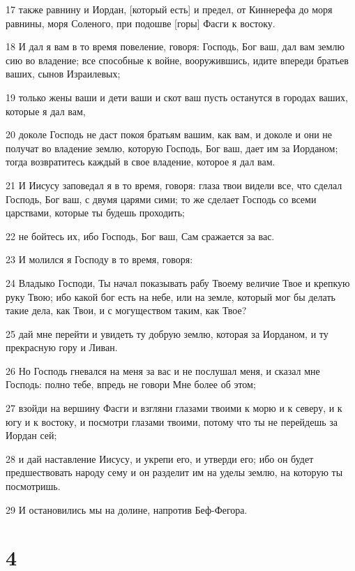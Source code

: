 \par 17 также равнину и Иордан, [который есть] и предел, от Киннерефа до моря равнины, моря Соленого, при подошве [горы] Фасги к востоку.
\par 18 И дал я вам в то время повеление, говоря: Господь, Бог ваш, дал вам землю сию во владение; все способные к войне, вооружившись, идите впереди братьев ваших, сынов Израилевых;
\par 19 только жены ваши и дети ваши и скот ваш пусть останутся в городах ваших, которые я дал вам,
\par 20 доколе Господь не даст покоя братьям вашим, как вам, и доколе и они не получат во владение землю, которую Господь, Бог ваш, дает им за Иорданом; тогда возвратитесь каждый в свое владение, которое я дал вам.
\par 21 И Иисусу заповедал я в то время, говоря: глаза твои видели все, что сделал Господь, Бог ваш, с двумя царями сими; то же сделает Господь со всеми царствами, которые ты будешь проходить;
\par 22 не бойтесь их, ибо Господь, Бог ваш, Сам сражается за вас.
\par 23 И молился я Господу в то время, говоря:
\par 24 Владыко Господи, Ты начал показывать рабу Твоему величие Твое и крепкую руку Твою; ибо какой бог есть на небе, или на земле, который мог бы делать такие дела, как Твои, и с могуществом таким, как Твое?
\par 25 дай мне перейти и увидеть ту добрую землю, которая за Иорданом, и ту прекрасную гору и Ливан.
\par 26 Но Господь гневался на меня за вас и не послушал меня, и сказал мне Господь: полно тебе, впредь не говори Мне более об этом;
\par 27 взойди на вершину Фасги и взгляни глазами твоими к морю и к северу, и к югу и к востоку, и посмотри глазами твоими, потому что ты не перейдешь за Иордан сей;
\par 28 и дай наставление Иисусу, и укрепи его, и утверди его; ибо он будет предшествовать народу сему и он разделит им на уделы землю, на которую ты посмотришь.
\par 29 И остановились мы на долине, напротив Беф-Фегора.

\chapter{4}

